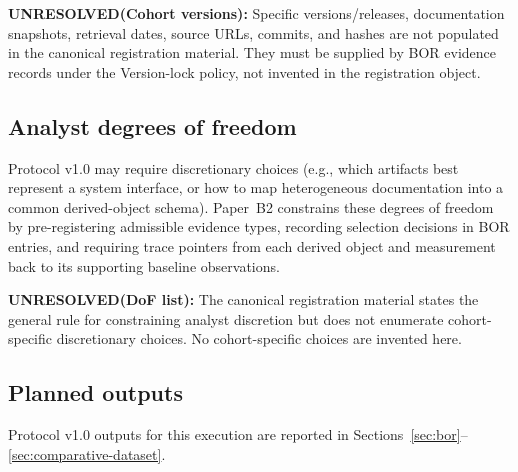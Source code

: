 \textbf{UNRESOLVED(Cohort versions):} Specific versions/releases, documentation snapshots, retrieval dates, source URLs, commits, and hashes are not populated in the canonical registration material. They must be supplied by BOR evidence records under the Version-lock policy, not invented in the registration object.


\subsection{Analyst degrees of freedom}
Protocol v1.0 may require discretionary choices (e.g., which artifacts best represent a system interface, or how to map heterogeneous documentation into a common derived-object schema). Paper~B2 constrains these degrees of freedom by pre-registering admissible evidence types, recording selection decisions in BOR entries, and requiring trace pointers from each derived object and measurement back to its supporting baseline observations.

\textbf{UNRESOLVED(DoF list):} The canonical registration material states the general rule for constraining analyst discretion but does not enumerate cohort-specific discretionary choices. No cohort-specific choices are invented here.

\subsection{Planned outputs}
Protocol v1.0 outputs for this execution are reported in Sections~\ref{sec:bor}--\ref{sec:comparative-dataset}.
